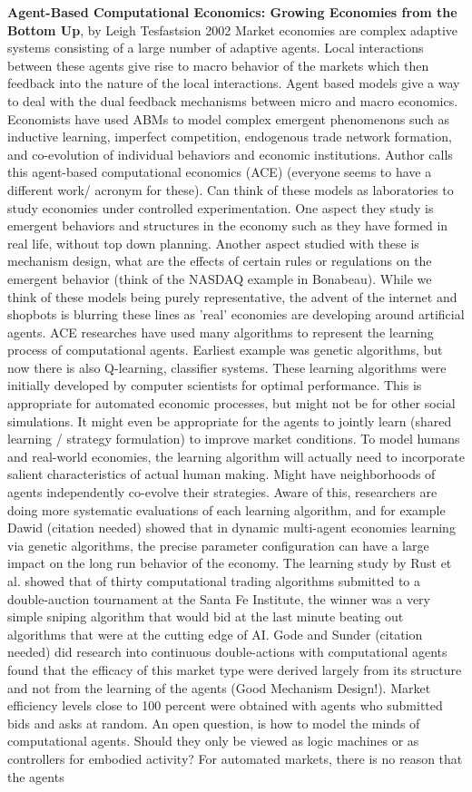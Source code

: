 \documentclass[12pt,twoside]{reedthesis}
\begin{document}
\textbf{Agent-Based Computational Economics: Growing Economies from the Bottom Up}, by Leigh Tesfastsion 2002
Market economies are complex adaptive systems consisting of a large number of adaptive agents. Local interactions between these agents give rise to macro behavior of the markets which then feedback into the nature of the local interactions. Agent based models give a way to deal with the dual feedback mechanisms between micro and macro economics. Economists have used ABMs to model complex emergent phenomenons such as inductive learning, imperfect competition, endogenous trade network formation, and co-evolution of individual behaviors and economic institutions. Author calls this agent-based computational economics (ACE) (everyone seems to have a different work/ acronym for these). Can think of these models as laboratories to study economies under controlled experimentation. One aspect they study is emergent behaviors and structures in the economy such as they have formed in real life, without top down planning. Another aspect studied with these is mechanism design, what are the effects of certain rules or regulations on the emergent behavior (think of the NASDAQ example in Bonabeau). While we think of these models being purely representative, the advent of the internet and shopbots is blurring these lines as 'real' economies are developing around artificial agents. ACE researches have used many algorithms to represent the learning process of computational agents. Earliest example was genetic algorithms, but now there is also Q-learning, classifier systems. These learning algorithms were initially developed by computer scientists for optimal performance. This is appropriate  for automated economic processes, but might not be for other social simulations. It might even be appropriate for the agents to jointly learn (shared learning / strategy formulation) to improve market conditions. To model humans and real-world economies, the learning algorithm will actually need to incorporate salient characteristics of actual human making. Might have neighborhoods of agents independently co-evolve their strategies. Aware of this, researchers are doing more systematic evaluations of each learning algorithm, and for example Dawid (citation needed) showed that in dynamic multi-agent economies learning via genetic algorithms, the precise parameter configuration can have a large impact on the long run behavior of the economy. The learning study by Rust et al. showed that of thirty computational trading algorithms submitted to a double-auction tournament at the Santa Fe Institute, the winner was a very simple sniping algorithm that would bid at the last minute beating out algorithms that were at the cutting edge of AI. Gode and Sunder (citation needed) did research into continuous double-actions with computational agents found that the efficacy of this market type were derived largely from its structure and not from the learning of the agents (Good Mechanism Design!). Market efficiency levels close to 100 percent were obtained with agents who submitted bids and asks at random. An open question, is how to model the minds of computational agents. Should they only be viewed as logic machines or as controllers for embodied activity? For automated markets, there is no reason that the agents 
\end{document}
